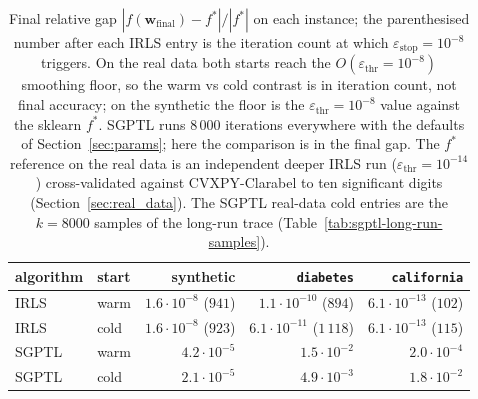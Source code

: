 \begin{table}[H]
    \centering
    \small
    \setlength{\tabcolsep}{8pt}
    \small
    \setlength{\tabcolsep}{6pt}
    \begin{tabular}{llrrr}
        \toprule
        algorithm & start & synthetic & \texttt{diabetes} & \texttt{california} \\
        \midrule
        IRLS  & warm & $1.6\cdot 10^{-8}$  ($941$)  & $1.1\cdot 10^{-10}$ ($894$)   & $6.1\cdot 10^{-13}$ ($102$) \\
        IRLS  & cold & $1.6\cdot 10^{-8}$  ($923$)  & $6.1\cdot 10^{-11}$ ($1\,118$) & $6.1\cdot 10^{-13}$ ($115$) \\
        SGPTL & warm & $4.2\cdot 10^{-5}$           & $1.5\cdot 10^{-2}$      & $2.0\cdot 10^{-4}$ \\
        SGPTL & cold & $2.1\cdot 10^{-5}$           & $4.9\cdot 10^{-3}$      & $1.8\cdot 10^{-2}$ \\
        \bottomrule
    \end{tabular}
    \caption{Final relative gap $|f(\mathbf{w}_\text{final})-f^{*}|/|f^{*}|$
    on each instance; the parenthesised number after each IRLS entry is the
    iteration count at which $\varepsilon_\text{stop}=10^{-8}$ triggers. On
    the real data both starts reach the $O(\varepsilon_\text{thr}=10^{-8})$
    smoothing floor, so the warm vs cold contrast is in iteration count, not
    final accuracy; on the synthetic the floor is the
    $\varepsilon_\text{thr}=10^{-8}$ value against the sklearn $f^{*}$. SGPTL
    runs $8\,000$ iterations everywhere with the defaults of
    Section~\ref{sec:params}; here the comparison is in the final gap. The
    $f^{*}$ reference on the real data is an independent deeper IRLS run
    ($\varepsilon_\text{thr}=10^{-14}$) cross-validated against CVXPY-Clarabel
    to ten significant digits (Section~\ref{sec:real_data}). The SGPTL
    real-data cold entries are the $k=8000$ samples of the long-run trace
    (Table~\ref{tab:sgptl-long-run-samples}).}
    \label{tab:warm-cold-summary}
\end{table}


